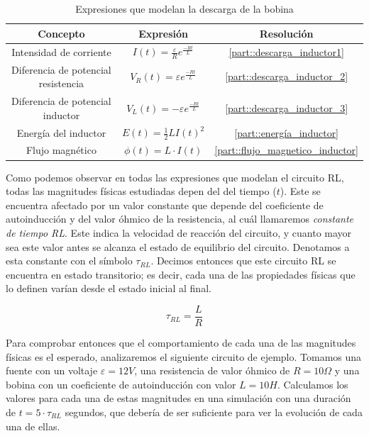 \documentclass[../main.tex]{subfiles}
\begin{document}
\begin{table}[!ht]
        \begin{center}
            \begin{tabular}{|| c | c | c ||}
                \hline
                \textbf{Concepto} & \textbf{Expresión} &  \textbf{Resolución}\\ \hline
                Intensidad de corriente & $I(t) = \frac{\varepsilon}{R}  e^{\frac{-Rt}{L}}$ & \ref{part::descarga_inductor1}\\
                Diferencia de potencial resistencia & $V_R(t) = \varepsilon  e^{\frac{-Rt}{L}}$ & \ref{part::descarga_inductor_2} \\ 
                Diferencia de potencial inductor & $V_L(t) = - \varepsilon   e^{\frac{-Rt}{L}}$ & \ref{part::descarga_inductor_3} \\ 
                Energía del inductor & $E(t) = \frac{1}{2}LI(t)^2 $ & \ref{part::energía_inductor} \\
                Flujo magnético & $\phi (t) = L \cdot I(t)$ & \ref{part::flujo_magnetico_inductor} \\
                \hline
                \end{tabular}
                \caption{Expresiones que modelan la descarga de la bobina}
                \label{tab::ecuaciones_descarga_rl}
        \end{center}
    \end{table}

Como podemos observar en todas las expresiones que modelan el circuito RL, todas las magnitudes físicas estudiadas depen del del tiempo ($t$). Este se encuentra afectado por un valor constante que depende del coeficiente de autoinducción y del valor óhmico de la resistencia, al cuál llamaremos \textit{constante de tiempo RL}. Este indica la velocidad de reacción del circuito, y cuanto mayor sea este valor antes se alcanza el estado de equilibrio del circuito. Denotamos a esta constante con el símbolo $\tau_{RL}$. Decimos entonces que este circuito RL se encuentra en estado transitorio; es decir, cada una de las propiedades físicas que lo definen varían desde el estado inicial al final.

\begin{equation}
    \label{eqq::constante_tiempo_rl}
    \tau_{RL} = \frac{L}{R}
\end{equation}

Para comprobar entonces que el comportamiento de cada una de las magnitudes físicas es el esperado, analizaremos el siguiente circuito de ejemplo. Tomamos una fuente con un voltaje $\varepsilon=12V$, una resistencia de valor óhmico de $R=10 \Omega$ y una bobina con un coeficiente de autoinducción con valor $L=10H$. Calculamos los valores para cada una de estas magnitudes en una simulación con una duración de $t=5\cdot \tau_{RL}$ segundos, que debería de ser suficiente para ver la evolución de cada una de ellas. \\
\end{document}
